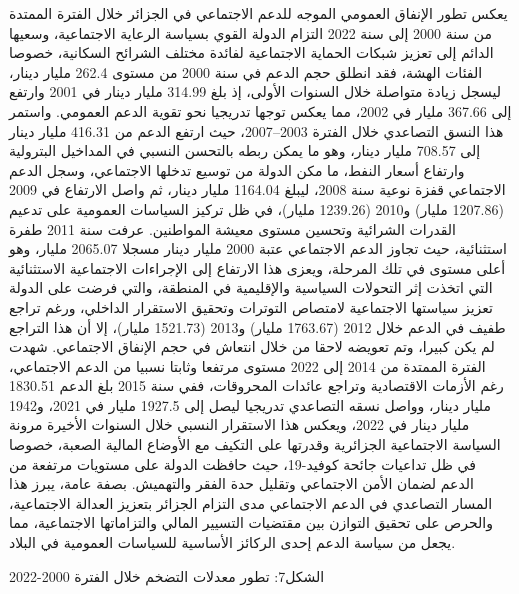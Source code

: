 \documentclass[12pt,a4paper]{report}
\begin{document}
يعكس تطور الإنفاق العمومي الموجه للدعم الاجتماعي في الجزائر خلال الفترة الممتدة من سنة 2000 إلى سنة 2022 التزام الدولة القوي بسياسة الرعاية الاجتماعية، وسعيها الدائم إلى تعزيز شبكات الحماية الاجتماعية لفائدة مختلف الشرائح السكانية، خصوصا الفئات الهشة، فقد انطلق حجم الدعم في سنة 2000 من مستوى 262.4 مليار دينار، ليسجل زيادة متواصلة خلال السنوات الأولى، إذ بلغ 314.99 مليار دينار في 2001 وارتفع إلى 367.66 مليار في 2002، مما يعكس توجها تدريجيا نحو تقوية الدعم العمومي.
واستمر هذا النسق التصاعدي خلال الفترة 2003–2007، حيث ارتفع الدعم من 416.31 مليار دينار إلى 708.57 مليار دينار، وهو ما يمكن ربطه بالتحسن النسبي في المداخيل البترولية وارتفاع أسعار النفط، ما مكن الدولة من توسيع تدخلها الاجتماعي، وسجل الدعم الاجتماعي قفزة نوعية سنة 2008، ليبلغ 1164.04 مليار دينار، ثم واصل الارتفاع في 2009 (1207.86 مليار) و2010 (1239.26 مليار)، في ظل تركيز السياسات العمومية على تدعيم القدرات الشرائية وتحسين مستوى معيشة المواطنين.
عرفت سنة 2011 طفرة استثنائية، حيث تجاوز الدعم الاجتماعي عتبة 2000 مليار دينار مسجلا 2065.07 مليار، وهو أعلى مستوى في تلك المرحلة، ويعزى هذا الارتفاع إلى الإجراءات الاجتماعية الاستثنائية التي اتخذت إثر التحولات السياسية والإقليمية في المنطقة، والتي فرضت على الدولة تعزيز سياستها الاجتماعية لامتصاص التوترات وتحقيق الاستقرار الداخلي، ورغم تراجع طفيف في الدعم خلال 2012 (1763.67 مليار) و2013 (1521.73 مليار)، إلا أن هذا التراجع لم يكن كبيرا، وتم تعويضه لاحقا من خلال انتعاش في حجم الإنفاق الاجتماعي.
شهدت الفترة الممتدة من 2014 إلى 2022 مستوى مرتفعا وثابتا نسبيا من الدعم الاجتماعي، رغم الأزمات الاقتصادية وتراجع عائدات المحروقات، ففي سنة 2015 بلغ الدعم 1830.51 مليار دينار، وواصل نسقه التصاعدي تدريجيا ليصل إلى 1927.5 مليار في 2021، و1942 مليار دينار في 2022، ويعكس هذا الاستقرار النسبي خلال السنوات الأخيرة مرونة السياسة الاجتماعية الجزائرية وقدرتها على التكيف مع الأوضاع المالية الصعبة، خصوصا في ظل تداعيات جائحة كوفيد-19، حيث حافظت الدولة على مستويات مرتفعة من الدعم لضمان الأمن الاجتماعي وتقليل حدة الفقر والتهميش.
بصفة عامة، يبرز هذا المسار التصاعدي في الدعم الاجتماعي مدى التزام الجزائر بتعزيز العدالة الاجتماعية، والحرص على تحقيق التوازن بين مقتضيات التسيير المالي والتزاماتها الاجتماعية، مما يجعل من سياسة الدعم إحدى الركائز الأساسية للسياسات العمومية في البلاد.

الشكل7: تطور معدلات التضخم خلال الفترة 2000-2022
\end{document}
